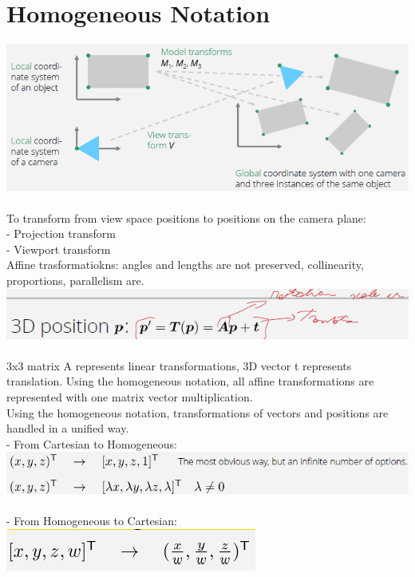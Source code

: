 \documentclass{article}
\begin{document}
\section{Homogeneous Notation}
\includegraphics[scale=0.6]{image21.png}\\\\
To transform from view space positions to positions on the camera plane:\\
- Projection transform\\
- Viewport transform\\
Affine trasformatiokns: angles and lengths are not preserved, collinearity, proportions, parallelism are.\\
\includegraphics[scale=0.6]{image22.png}\\\\
3x3 matrix A represents linear transformations, 3D vector t represents translation. Using the homogeneous notation, all affine transformations are represented with one matrix vector multiplication.\\
Using the homogeneous notation, transformations of vectors and positions are handled in a unified way.\\
- From Cartesian to Homogeneous:\\
\includegraphics[scale=0.6]{image23.png}\\\\
- From Homogeneous to Cartesian:\\
\includegraphics[scale=0.6]{image24.png}\\\\
\end{document}
